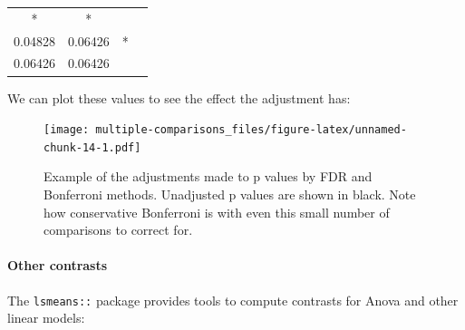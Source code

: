 \documentclass[]{article}
\let\oldparagraph\paragraph
\renewcommand{\paragraph}[1]{\oldparagraph{#1}\mbox{}}
\theoremstyle{definition}
\theoremstyle{definition}
\theoremstyle{definition}
\theoremstyle{remark}
\begin{document}
\begin{longtable}[]{@{}cccc@{}}
\begin{minipage}[t]{0.10\columnwidth}
*\strut
\end{minipage} & \begin{minipage}[t]{0.14\columnwidth}\centering\strut
*\strut
\end{minipage}\tabularnewline
\begin{minipage}[t]{0.12\columnwidth}\centering\strut
0.04828\strut
\end{minipage} & \begin{minipage}[t]{0.12\columnwidth}\centering\strut
0.06426\strut
\end{minipage} & \begin{minipage}[t]{0.10\columnwidth}\centering\strut
*\strut
\end{minipage} & \begin{minipage}[t]{0.14\columnwidth}\centering\strut
\strut
\end{minipage}\tabularnewline
\begin{minipage}[t]{0.12\columnwidth}\centering\strut
0.06426\strut
\end{minipage} & \begin{minipage}[t]{0.12\columnwidth}\centering\strut
0.06426\strut
\end{minipage} & \begin{minipage}[t]{0.10\columnwidth}\centering\strut
\strut
\end{minipage} & \begin{minipage}[t]{0.14\columnwidth}\centering\strut
\strut
\end{minipage}\tabularnewline
\bottomrule
\end{longtable}

We can plot these values to see the effect the adjustment has:

\begin{figure}
\centering
\texttt{[image: multiple-comparisons\_files/figure-latex/unnamed-chunk-14-1.pdf]}
\caption{\label{fig:unnamed-chunk-14}Example of the adjustments made to p
values by FDR and Bonferroni methods. Unadjusted p values are shown in
black. Note how conservative Bonferroni is with even this small number
of comparisons to correct for.}
\end{figure}

\hypertarget{contrasts}{\paragraph{Other contrasts}\label{contrasts}}

The \texttt{lsmeans::} package provides tools to compute contrasts for
Anova and other linear models:
\end{document}
